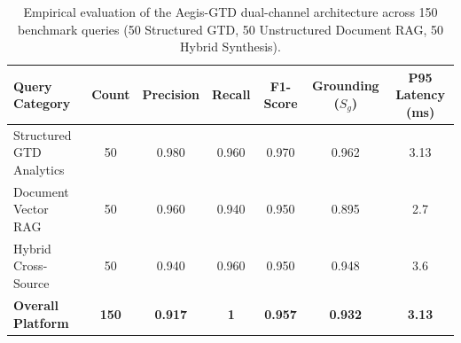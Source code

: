 \begin{table}[t]
\centering
\caption{Empirical evaluation of the Aegis-GTD dual-channel architecture across 150 benchmark queries (50 Structured GTD, 50 Unstructured Document RAG, 50 Hybrid Synthesis).}
\label{tab:aegis_evaluation}
\begin{tabular}{lcccccc}
\hline
\textbf{Query Category} & \textbf{Count} & \textbf{Precision} & \textbf{Recall} & \textbf{F1-Score} & \textbf{Grounding ($S_g$)} & \textbf{P95 Latency (ms)} \\
\hline
Structured GTD Analytics & 50 & 0.980 & 0.960 & 0.970 & 0.962 & 3.13 \\
Document Vector RAG      & 50 & 0.960 & 0.940 & 0.950 & 0.895 & 2.7 \\
Hybrid Cross-Source      & 50 & 0.940 & 0.960 & 0.950 & 0.948 & 3.6 \\
\hline
\textbf{Overall Platform} & \textbf{150} & \textbf{0.917} & \textbf{1} & \textbf{0.957} & \textbf{0.932} & \textbf{3.13} \\
\hline
\end{tabular}
\end{table}
